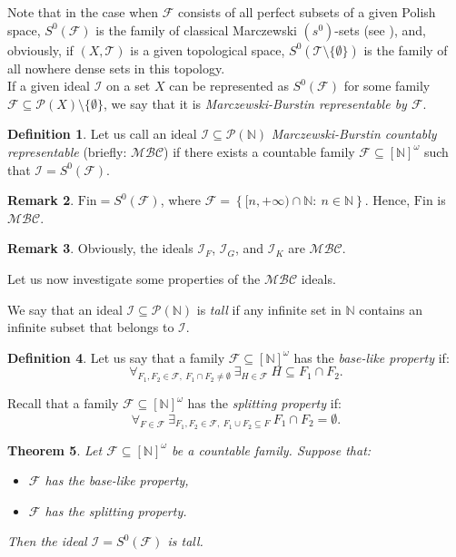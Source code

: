 \documentclass{amsart}
\newtheorem{thm}{Theorem}[section]
\theoremstyle{definition}
\newtheorem{df}[thm]{Definition}
\newtheorem{remark}[thm]{Remark}
\newcommand{\N}{{\mathbb N}}
\newcommand{\Fin}{\textrm{Fin}}
\newcommand{\I}{\mathcal I}
\newcommand{\T}{\mathcal{T}}
\newcommand{\InfSubs}{[\N]^{\omega}}
\newcommand{\MB}{S^0}
\newcommand{\MBC}{\mathcal{MBC}}
\begin{document}
Note that in the case when $\mathcal{F}$ consists of all perfect subsets of a given Polish space, $\MB(\mathcal{F})$ is the family of classical Marczewski $(s^0)$-sets (see \cite{Sz}), and, obviously, if $(X,\T)$ is a given topological space, $\MB(\T\setminus\{\emptyset\})$ is the family of all nowhere dense sets in this topology.\\


If a given ideal $\I$ on a set $X$ can be represented as $\MB(\mathcal{F})$ for some family $\mathcal{F}\subseteq \mathcal{P}(X)\setminus\{\emptyset\}$, we say that it is \emph{Marczewski-Burstin representable by $\mathcal{F}$}. 

\begin{df}
Let us call an ideal $\I\subseteq \mathcal{P}(\N)$ \emph{Marczewski-Burstin countably representable} (briefly: $\MBC$) if there exists a countable family $\mathcal{F}\subseteq \InfSubs$ such that $\I = \MB(\mathcal{F})$.
\end{df}

\begin{remark} 
$\Fin = \MB(\mathcal{F})$, where $\mathcal{F}= \left\{[n, +\infty)\cap\N :\ n\in\N\right\}$. Hence, $\Fin$ is $\MBC$.
\end{remark}

\begin{remark} 
Obviously, the ideals $\I_F$, $\I_G$, and $\I_K$ are $\MBC$.
\end{remark}

Let us now investigate some properties of the $\MBC$ ideals.

We say that an ideal $\mathcal{I}\subseteq\mathcal{P}(\N)$ is \emph{tall} if any infinite set in $\N$ contains an infinite subset that belongs to $\mathcal{I}$.

\begin{df}
Let us say that a family $\mathcal{F}\subseteq \InfSubs$ has the \emph{base-like property} if:
$$\forall_{F_1, F_2\in\mathcal{F},\ F_1\cap F_2\neq\emptyset}\ \exists_{H\in\mathcal{F}}\ H\subseteq F_1\cap F_2.$$
\end{df}

Recall that a family $\mathcal{F} \subseteq \InfSubs$ has the \emph{splitting property} if: 
$$\forall_{F\in\mathcal{F}}\ \exists_{F_1,F_2\in\mathcal{F},\ F_1\cup F_2 \subseteq F}\ F_1\cap F_2 = \emptyset.$$

\begin{thm} \label{thmtall}
Let $\mathcal{F}\subseteq \InfSubs$ be a countable family. Suppose that: 
\begin{itemize}
	\item[$(i)$] $\mathcal{F}$ has the base-like property,
	\item[$(ii)$] $\mathcal{F}$ has the splitting property.
\end{itemize}
Then the ideal $\I=\MB(\mathcal{F})$ is tall.
\end{thm}
\end{document}

